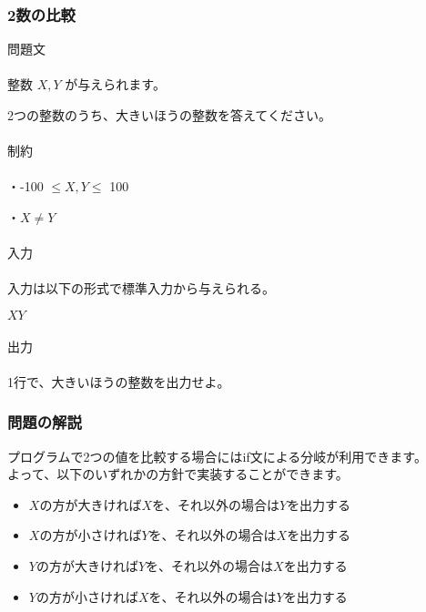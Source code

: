 \clearpage

\subsubsection{2数の比較}
\noindent
{\LARGE 問題文}\\ \hrulefill \\

\noindent
整数 $X, Y$ が与えられます。

\noindent
2つの整数のうち、大きいほうの整数を答えてください。
\\ \\
\noindent
{\LARGE 制約}\\ \hrulefill \\

\noindent
・-100 $\leq X,Y \leq$ 100

\noindent
・$X \neq Y$
\\ \\
\noindent
{\LARGE 入力}\\ \hrulefill \\

\noindent
入力は以下の形式で標準入力から与えられる。 

\noindent
$X Y$
\\ \\
\noindent
{\LARGE 出力}\\ \hrulefill \\

\noindent
1行で、大きいほうの整数を出力せよ。

\clearpage

\subsubsection{問題の解説}
\noindent
プログラムで2つの値を比較する場合にはif文による分岐が利用できます。\\
よって、以下のいずれかの方針で実装することができます。

\begin{itemize}
    \item $X$の方が大きければ$X$を、それ以外の場合は$Y$を出力する
    \item $X$の方が小さければ$Y$を、それ以外の場合は$X$を出力する
    \item $Y$の方が大きければ$Y$を、それ以外の場合は$X$を出力する
    \item $Y$の方が小さければ$X$を、それ以外の場合は$Y$を出力する
\end{itemize}

